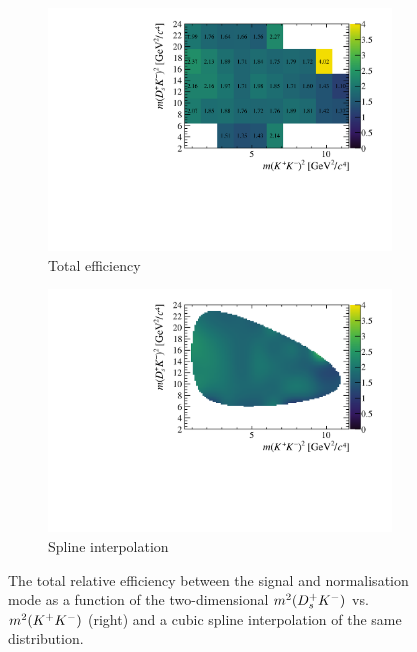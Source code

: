 \begin{figure}[!h]
   \centering
   \begin{subfigure}[t]{0.4\textwidth}
      \includegraphics[width=1.0\textwidth]{figs/B2DsKK/Full_Eff_Hist_All.pdf}
      \caption{Total efficiency}
      \label{fig:B2DsKK_eff_total_hist}
   \end{subfigure}
   \begin{subfigure}[t]{0.4\textwidth}
      \includegraphics[width=1.0\textwidth]{figs/B2DsKK/Full_Eff_Spline_All_withLimit.pdf}
      \caption{Spline interpolation}
      \label{fig:B2DsKK_eff_total_spline}
   \end{subfigure}
   \caption{The total relative efficiency between the signal and normalisation mode as a function of the two-dimensional $m^{2}({{D}^+_{s}}{{K}^-})$ vs. $m^{2}({{K}^+}{{K}^-})$ (right) and a cubic spline interpolation of the same distribution.}
   \label{fig:B2DsKK_total_eff}
\end{figure}


